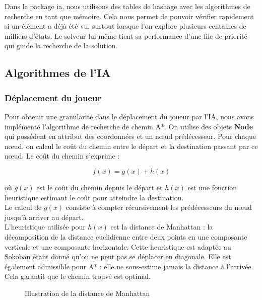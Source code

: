 \documentclass[a4paper,12pt]{article} %
\begin{document}
Dans le package ia, nous utilisons des tables de hashage avec les algorithmes de recherche en tant que mémoire. Cela nous permet de pouvoir vérifier rapidement si un élément a déjà été vu, surtout lorsque l'on explore plusieurs centaines de milliers d'états.
Le solveur lui-même tient sa performance d'une file de priorité qui guide la recherche de la solution.

\subsection{Algorithmes de l'IA}

\subsubsection{Déplacement du joueur}

Pour obtenir une granularité dans le déplacement du joueur par l'IA, nous avons implémenté l'algorithme de recherche de chemin A*. On utilise des objets \textbf{Node} qui possédent en attribut des coordonnées et un nœud prédécesseur. Pour chaque nœud, on calcul le coût du chemin entre le départ et la destination passant par ce nœud. Le coût du chemin s'exprime :

$$ f(x) = g(x) + h(x)$$

où $g(x)$ est le coût du chemin depuis le départ et $h(x)$ est une fonction heuristique estimant le coût pour atteindre la destination.\\

Le calcul de $g(x)$ consiste à compter récursivement les prédécesseurs du nœud jusqu'à arriver au départ.\\
L'heuristique utilisée pour $h(x)$ est la distance de Manhattan : la décomposition de la distance euclidienne entre deux points en une composante verticale et une composante horizontale. Cette heuristique est adaptée au Sokoban étant donné qu'on ne peut pas se déplacer en diagonale. Elle est également admissible pour A* : elle ne sous-estime jamais la distance à l'arrivée. Cela garantit que le chemin trouvé est optimal.

\begin{figure}[!h]
\centering
{}
\caption{Illustration de la distance de Manhattan}
\end{figure}
\end{document}
